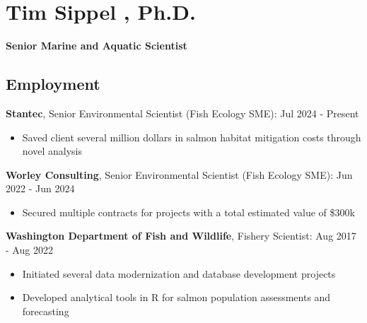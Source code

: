 \documentclass[
  letterpaper,
  DIV=11,
  numbers=noendperiod]{scrartcl}
\author{}
\date{}
\providecommand{\tightlist}{%
  \setlength{\itemsep}{0pt}\setlength{\parskip}{0pt}}
\begin{document}
\section{Tim Sippel , Ph.D.~}\label{tim-sippel-ph.d.}

\textbf{Senior Marine and Aquatic Scientist}

\subsection{Employment}\label{employment}

\textbf{Stantec}, Senior Environmental Scientist (Fish Ecology SME): Jul
2024 - Present

\begin{tcolorbox}[enhanced jigsaw, arc=.35mm, colframe=quarto-callout-note-color-frame, breakable, leftrule=.75mm, opacityback=0, colback=white, left=2mm, rightrule=.15mm, toprule=.15mm, bottomrule=.15mm]

\begin{itemize}
\tightlist
\item
  Saved client several million dollars in salmon habitat mitigation
  costs through novel analysis
\end{itemize}

\end{tcolorbox}

\textbf{Worley Consulting}, Senior Environmental Scientist (Fish Ecology
SME): Jun 2022 - Jun 2024

\begin{tcolorbox}[enhanced jigsaw, arc=.35mm, colframe=quarto-callout-note-color-frame, breakable, leftrule=.75mm, opacityback=0, colback=white, left=2mm, rightrule=.15mm, toprule=.15mm, bottomrule=.15mm]

\begin{itemize}
\tightlist
\item
  Secured multiple contracts for projects with a total estimated value
  of \$300k
\end{itemize}

\end{tcolorbox}

\textbf{Washington Department of Fish and Wildlife}, Fishery Scientist:
Aug 2017 - Aug 2022

\begin{tcolorbox}[enhanced jigsaw, arc=.35mm, colframe=quarto-callout-note-color-frame, breakable, leftrule=.75mm, opacityback=0, colback=white, left=2mm, rightrule=.15mm, toprule=.15mm, bottomrule=.15mm]

\begin{itemize}
\tightlist
\item
  Initiated several data modernization and database development projects
\item
  Developed analytical tools in R for salmon population assessments and
  forecasting
\end{itemize}

\end{tcolorbox}
\end{document}
